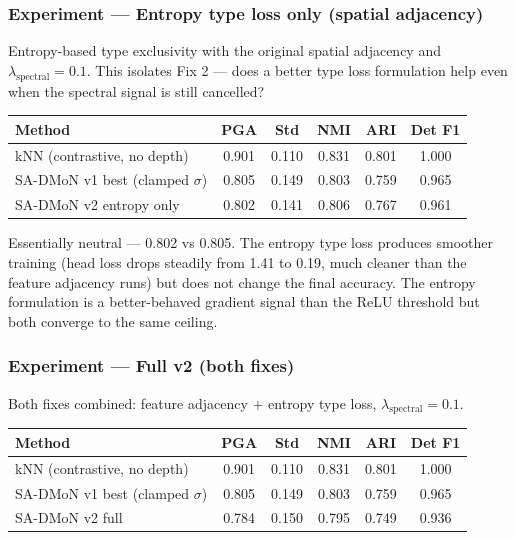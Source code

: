 \subsubsection{Experiment --- Entropy type loss only (spatial adjacency)}

Entropy-based type exclusivity with the original spatial adjacency and $\lambda_{\text{spectral}} = 0.1$. This isolates Fix 2 --- does a better type loss formulation help even when the spectral signal is still cancelled?

\begin{center}
\footnotesize
\begin{tabular}{lccccc}
\toprule
Method & PGA & Std & NMI & ARI & Det F1 \\
\midrule
kNN (contrastive, no depth) & 0.901 & 0.110 & 0.831 & 0.801 & 1.000 \\
SA-DMoN v1 best (clamped $\sigma$) & 0.805 & 0.149 & 0.803 & 0.759 & 0.965 \\
SA-DMoN v2 entropy only & 0.802 & 0.141 & 0.806 & 0.767 & 0.961 \\
\bottomrule
\end{tabular}
\end{center}

Essentially neutral --- 0.802 vs 0.805. The entropy type loss produces smoother training (head loss drops steadily from 1.41 to 0.19, much cleaner than the feature adjacency runs) but does not change the final accuracy. The entropy formulation is a better-behaved gradient signal than the ReLU threshold but both converge to the same ceiling.


\subsubsection{Experiment --- Full v2 (both fixes)}

Both fixes combined: feature adjacency + entropy type loss, $\lambda_{\text{spectral}} = 0.1$.

\begin{center}
\footnotesize
\begin{tabular}{lccccc}
\toprule
Method & PGA & Std & NMI & ARI & Det F1 \\
\midrule
kNN (contrastive, no depth) & 0.901 & 0.110 & 0.831 & 0.801 & 1.000 \\
SA-DMoN v1 best (clamped $\sigma$) & 0.805 & 0.149 & 0.803 & 0.759 & 0.965 \\
SA-DMoN v2 full & 0.784 & 0.150 & 0.795 & 0.749 & 0.936 \\
\bottomrule
\end{tabular}
\end{center}

